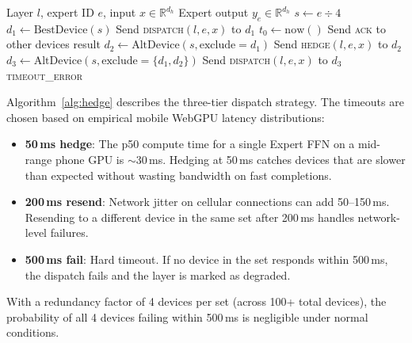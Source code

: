 \documentclass[11pt,a4paper]{article}
\begin{document}
\begin{algorithm}[t]
\caption{Hedged Expert Dispatch}
\label{alg:hedge}
\begin{algorithmic}[1]
\Require Layer $l$, expert ID $e$, input $x \in \mathbb{R}^{d_h}$
\Ensure Expert output $y_e \in \mathbb{R}^{d_h}$
\State $s \gets e \div 4$ 
\State $d_1 \gets \text{BestDevice}(s)$
\State Send \textsc{dispatch}$(l, e, x)$ to $d_1$
\State $t_0 \gets \text{now}()$
    \State Send \textsc{ack} to other devices 
    \State \Return result
  \EndIf
    \State $d_2 \gets \text{AltDevice}(s, \text{exclude}=d_1)$
    \State Send \textsc{hedge}$(l, e, x)$ to $d_2$
  \EndIf
    \State $d_3 \gets \text{AltDevice}(s, \text{exclude}=\{d_1,d_2\})$
    \State Send \textsc{dispatch}$(l, e, x)$ to $d_3$
  \EndIf
\EndWhile
\State \Return \textsc{timeout\_error}
\end{algorithmic}
\end{algorithm}

Algorithm~\ref{alg:hedge} describes the three-tier dispatch strategy.
The timeouts are chosen based on empirical mobile WebGPU latency
distributions:

\begin{itemize}
  \item \textbf{50\,ms hedge}: The p50 compute time for a single
    Expert FFN on a mid-range phone GPU is $\sim$30\,ms. Hedging at
    50\,ms catches devices that are slower than expected without
    wasting bandwidth on fast completions.

  \item \textbf{200\,ms resend}: Network jitter on cellular connections
    can add 50--150\,ms. Resending to a different device in the same
    set after 200\,ms handles network-level failures.

  \item \textbf{500\,ms fail}: Hard timeout. If no device in the set
    responds within 500\,ms, the dispatch fails and the layer is
    marked as degraded.
\end{itemize}

With a redundancy factor of 4 devices per set (across 100+ total
devices), the probability of all 4 devices failing within 500\,ms is
negligible under normal conditions.
\end{document}
